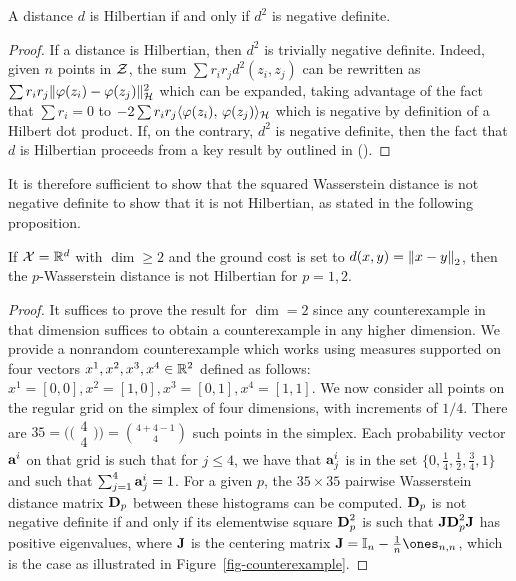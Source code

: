 \begin{prop}\label{prop-negative-definite} A distance $d$ is Hilbertian if and only if $d^2$ is negative definite.
\end{prop}
\begin{proof} If a distance is Hilbertian, then $d^2$ is trivially negative definite. Indeed, given $n$ points in $\mathcal{Z}$, the sum $\sum r_i r_j d^2(z_i,z_j)$ can be rewritten as $\sum r_i r_j \|\tphi(z_i)-\tphi(z_j)\|_\RKHS^2$ which can be expanded, taking advantage of the fact that $\sum r_i=0$ to $-2\sum r_i r_j \dotp{\tphi(z_i)}{\tphi(z_j)}_\RKHS$ which is negative by definition of a Hilbert dot product. If, on the contrary, $d^2$ is negative definite, then the fact that $d$ is Hilbertian proceeds from a key result by \citet{schoenberg38} outlined in (\cite[p. 82, Prop. 3.2]{berg84harmonic}).
\end{proof}

It is therefore sufficient to show that the squared Wasserstein distance is not negative definite to show that it is not Hilbertian, as stated in the following proposition.

\begin{prop}\label{prop-negative-definite-negative} If $\mathcal{X}=\mathbb{R}^d$ with $\dim\geq 2$ and the ground cost is set to $d(x,y)=\left\| x-y \right\|_2$, then the $p$-Wasserstein distance is not Hilbertian for $p=1,2$.
\end{prop}

\begin{proof} It suffices to prove the result for $\dim=2$ since any counterexample in that dimension suffices to obtain a counterexample in any higher dimension. We provide a nonrandom counterexample which works using measures supported on four vectors $x^1, x^2,x^3,x^4\in\mathbb{R}^{2}$ defined as follows: $x^{1}=[0,0], x^{2}=[1,0], x^{3}=[0,1], x^{4}=[1,1]$. We now consider all points on the regular grid on the simplex of four dimensions, with increments of $1/4$. There are $35=\bigl(\!\bigl(\substack{4\\4}\bigl)\!\bigl)=\binom{4+4-1}{4}$ such points in the simplex. Each probability vector $\mathrm{\textbf{a}}^i$ on that grid is such that for $j\leq 4$, we have that $\mathrm{\textbf{a}}^i_j$ is in the set $\{0,\tfrac{1}{4},\tfrac{1}{2},\tfrac{3}{4},1\}$ and such that $\sum_{j=1}^4\mathrm{\textbf{a}}^i_j=1$. For a given $p$, the $35\times 35$ pairwise Wasserstein distance matrix $\mathrm{\textbf{D}}_p$ between these histograms can be computed. $\mathrm{\textbf{D}}_p$ is not negative definite if and only if its elementwise square $\mathrm{\textbf{D}}_p^2$ is such that $\mathrm{\textbf{J}} \mathrm{\textbf{D}}_p^2 \mathrm{\textbf{J}}$ has positive eigenvalues, where $\mathrm{\textbf{J}}$ is the centering matrix $\J=\Identity_n-\tfrac{1}{n}\ones_{n,n}$, which is the case as illustrated in Figure~\ref{fig-counterexample}.
\end{proof}
	
